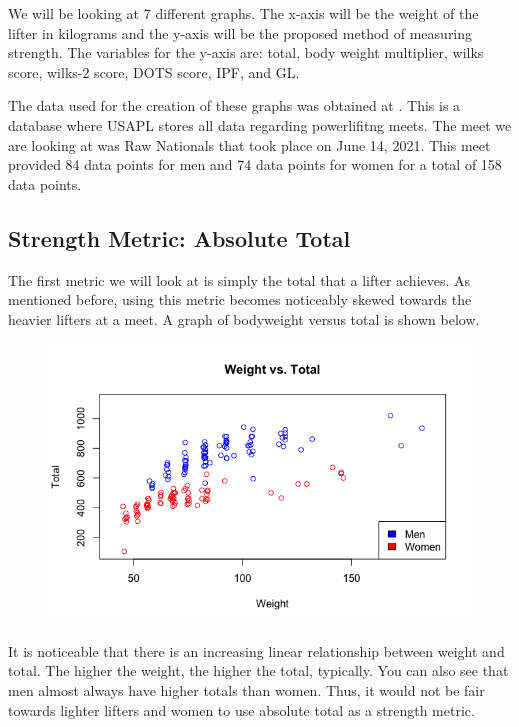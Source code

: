 \documentclass[10pt,letterpaper]{article}
\begin{document}
    We will be looking at 7 different graphs. The x-axis will be the weight of the lifter in kilograms and the y-axis will be the proposed method of measuring strength. The variables for the y-axis are: total, body weight multiplier, wilks score, wilks-2 score, DOTS score, IPF, and GL.

    The data used for the creation of these graphs was obtained at \cite{data}. This is a database where USAPL stores all data regarding powerlifitng meets. The meet we are looking at was Raw Nationals that took place on June 14, 2021. This meet provided 84 data points for men and 74 data points for women for a total of 158 data points.  

    \subsection{Strength Metric: Absolute Total}
    The first metric we will look at is simply the total that a lifter achieves. As mentioned before, using this metric becomes noticeably skewed towards the heavier lifters at a meet. A graph of bodyweight versus total is shown below. 

    \begin{figure}[H]
        \center 
        \includegraphics[width=35em]{weightVStotal.png}
        \label{total}
    \end{figure}

    It is noticeable that there is an increasing linear relationship between weight and total. The higher the weight, the higher the total, typically. You can also see that men almost always have higher totals than women. Thus, it would not be fair towards lighter lifters and women to use absolute total as a strength metric. 
\end{document}
